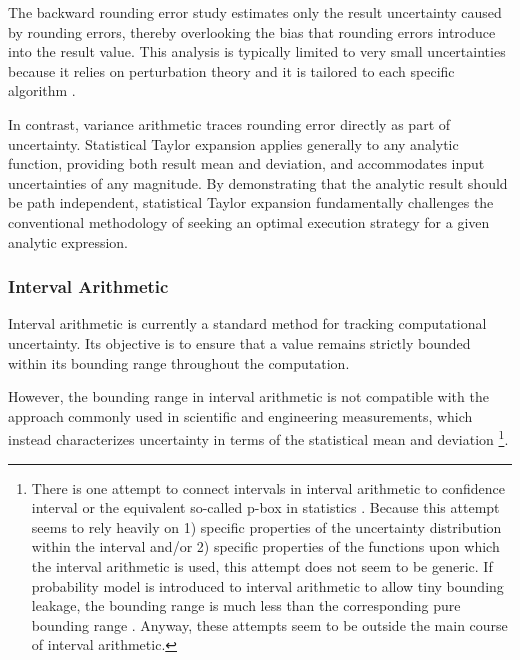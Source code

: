 \documentclass[twoside]{article}
\numberwithin{equation}{section}
\begin{document}
The backward rounding error study \cite{Rounding_Error}\cite{Algorithms_Accuracy}\cite{prob_interval} estimates only the result uncertainty caused by rounding errors, thereby overlooking the bias that rounding errors introduce into the result value.
This analysis is typically limited to very small uncertainties because it relies on perturbation theory and it is tailored to each specific algorithm \cite{Rounding_Error}\cite{Algorithms_Accuracy}\cite{prob_interval}.

In contrast, variance arithmetic traces rounding error directly as part of uncertainty.
Statistical Taylor expansion applies generally to any analytic function, providing both result mean and deviation, and accommodates input uncertainties of any magnitude.
By demonstrating that the analytic result should be path independent, statistical Taylor expansion fundamentally challenges the conventional methodology of seeking an optimal execution strategy for a given analytic expression.




\subsubsection{Interval Arithmetic}

Interval arithmetic \cite{Precise_Numerical_Methods}\cite{Interval_Analysis}\cite{Worst_Case_Error_Bounds}\cite{Interval_Analysis_Theory_Applications}\cite{Interval_Arithmetic}\cite{Interval_Analysis_Notations} is currently a standard method for tracking computational uncertainty.  
Its objective is to ensure that a value remains strictly bounded within its bounding range throughout the computation.

However, the bounding range in interval arithmetic is not compatible with the approach commonly used in scientific and engineering measurements, which instead characterizes uncertainty in terms of the statistical mean and deviation \cite{Statistical_Methods}\cite{Precisions_Physical_Measurements}  
\footnote{
There is one attempt to connect intervals in interval arithmetic to confidence interval or the equivalent so-called p-box in statistics \cite{Statistics_For_Interval_Arithmetic}. 
Because this attempt seems to rely heavily on 1) specific properties of the uncertainty distribution within the interval and/or 2) specific properties of the functions upon which the interval arithmetic is used, this attempt does not seem to be generic. 
If probability model is introduced to interval arithmetic to allow tiny bounding leakage, the bounding range is much less than the corresponding pure bounding range \cite{prob_interval}.
Anyway, these attempts seem to be outside the main course of interval arithmetic.
}. 
\end{document}
